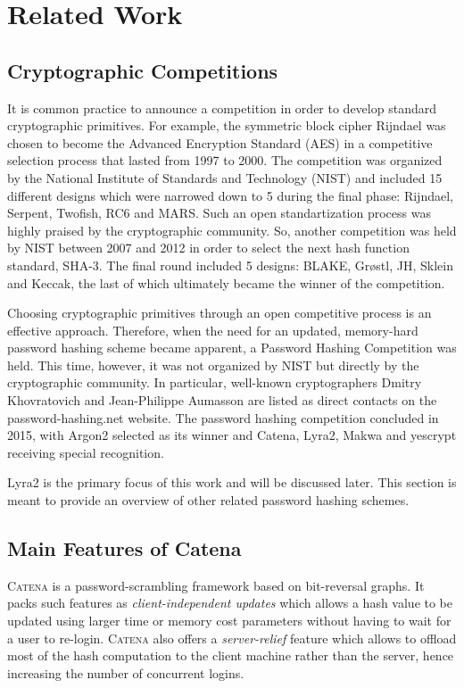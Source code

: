 \chapter{Related Work}
\label{chapter:related-work}

\section{Cryptographic Competitions}

It is common practice to announce a competition in order to develop standard cryptographic primitives. For example, the symmetric block cipher Rijndael \cite{daemen:2002:DRA} was chosen to become the Advanced Encryption Standard (AES) \cite{aes-fips} in a competitive selection process that lasted from 1997 to 2000. The competition was organized by the National Institute of Standards and Technology (NIST) and included 15 different designs which were narrowed down to 5 during the final phase: Rijndael, Serpent, Twofish, RC6 and MARS. Such an open standartization process was highly praised by the cryptographic community. So, another competition was held by NIST between 2007 and 2012 in order to select the next hash function standard, SHA-3. The final round included 5 designs: BLAKE, Grøstl, JH, Sklein and Keccak, the last of which ultimately became the winner of the competition.

Choosing cryptographic primitives through an open competitive process is an effective approach. Therefore, when the need for an updated, memory-hard password hashing scheme became apparent, a Password Hashing Competition was held. This time, however, it was not organized by NIST but directly by the cryptographic community. In particular, well-known cryptographers Dmitry Khovratovich and Jean-Philippe Aumasson are listed as direct contacts on the password-hashing.net website. The password hashing competition concluded in 2015, with Argon2 selected as its winner and Catena, Lyra2, Makwa and yescrypt receiving special recognition.

Lyra2 is the primary focus of this work and will be discussed later. This section is meant to provide an overview of other related password hashing schemes.

\section{Main Features of Catena}

\textsc{Catena} is a password-scrambling framework based on bit-reversal graphs. It packs such features as \emph{client-independent updates} which allows a hash value to be updated using larger time or memory cost parameters without having to wait for a user to re-login. \textsc{Catena} also offers a \emph{server-relief} feature which allows to offload most of the hash computation to the client machine rather than the server, hence increasing the number of concurrent logins.

